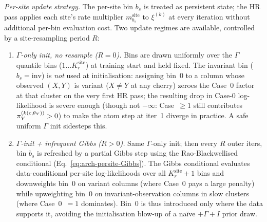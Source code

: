 \emph{Per-site update strategy.} The per-site bin
$b_s$ is treated as persistent state; the HR pass applies each
site's rate multiplier $m^{\mathrm{site}}_{b_s}$ to $\xi^{(k)}$ at
every iteration without additional per-bin evaluation cost. Two
update regimes are available, controlled by a site-resampling period $R$:
\begin{enumerate}
  \item \emph{$\Gamma$-only init, no resample ($R = 0$).} Bins are drawn
    uniformly over the $\Gamma$ quantile bins ($1 \ldots K_r^{\mathrm{site}}$)
    at training start and held fixed. The invariant bin ($b_s = \mathrm{inv}$)
    is \emph{not} used at initialisation: assigning bin~0 to a column
    whose observed $(X, Y)$ is variant ($X \neq Y$ at any cherry)
    zeroes the Case~0 factor at that cluster on the very first HR
    pass; the resulting drop in Case-0 log-likelihood is severe
    enough (though not $-\infty$: Case~$\geq 1$ still contributes
    $\pi^{(k(c, \theta_Y))}_Y > 0$) to make the atom step at iter~1
    diverge in practice. A safe uniform $\Gamma$ init sidesteps this.
  \item \emph{$\Gamma$-init + infrequent Gibbs ($R > 0$).} Same
    $\Gamma$-only init; then every $R$ outer iters, bin
    $b_s$ is refreshed by a partial Gibbs step using the Rao-Black\-well\-ised
    conditional (Eq.~\ref{eq:arch-persite-Gibbs}). The Gibbs
    conditional evaluates data-conditional per-site log-likelihoods
    over all $K_r^{\mathrm{site}} + 1$ bins and downweights bin~0 on
    variant columns (where Case~0 pays a large penalty) while
    upweighting bin~0 on invariant-observation columns in slow
    clusters (where Case~0~$= 1$ dominates). Bin~0 is thus
    introduced only where the data supports it, avoiding the
    initialisation blow-up of a naïve $+\Gamma+I$ prior draw.
\end{enumerate}

